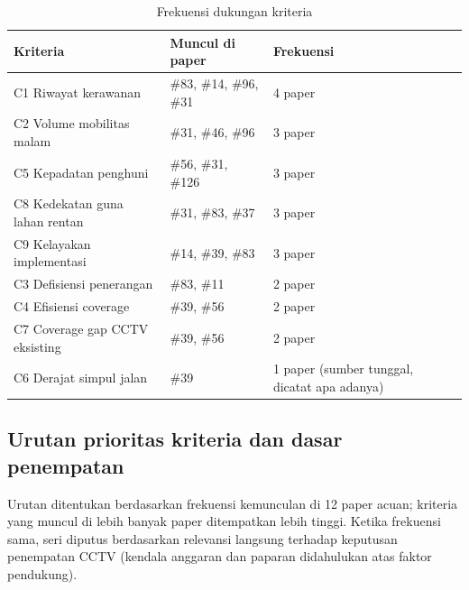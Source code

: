 \documentclass[a4paper,11pt]{article}
\begin{document}
\begin{table}[htbp]
\centering
\begin{tabular}{p{5cm}p{5cm}p{3cm}}
\toprule
\textbf{Kriteria} & \textbf{Muncul di paper} & \textbf{Frekuensi} \\
\midrule
C1 Riwayat kerawanan & \#83, \#14, \#96, \#31 & 4 paper \\
C2 Volume mobilitas malam & \#31, \#46, \#96 & 3 paper \\
C5 Kepadatan penghuni & \#56, \#31, \#126 & 3 paper \\
C8 Kedekatan guna lahan rentan & \#31, \#83, \#37 & 3 paper \\
C9 Kelayakan implementasi & \#14, \#39, \#83 & 3 paper \\
C3 Defisiensi penerangan & \#83, \#11 & 2 paper \\
C4 Efisiensi coverage & \#39, \#56 & 2 paper \\
C7 Coverage gap CCTV eksisting & \#39, \#56 & 2 paper \\
C6 Derajat simpul jalan & \#39 & 1 paper (sumber tunggal, dicatat apa adanya) \\
\bottomrule
\end{tabular}
\caption{Frekuensi dukungan kriteria}
\end{table}

\subsection{Urutan prioritas kriteria dan dasar penempatan}

Urutan ditentukan berdasarkan frekuensi kemunculan di 12 paper acuan; kriteria yang muncul di lebih banyak paper ditempatkan lebih tinggi. Ketika frekuensi sama, seri diputus berdasarkan relevansi langsung terhadap keputusan penempatan CCTV (kendala anggaran dan paparan didahulukan atas faktor pendukung).
\end{document}
